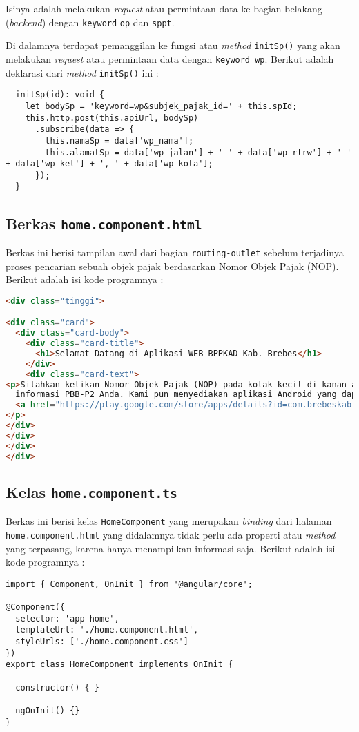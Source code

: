 \documentclass[pdftex,12pt, oneside]{article}
\begin{document}
Isinya adalah melakukan \textit{request} atau permintaan data ke bagian-belakang (\textit{backend}) dengan \texttt{keyword} \texttt{op} dan \texttt{sppt}.

Di dalamnya terdapat pemanggilan ke fungsi atau \textit{method} \texttt{initSp()} yang akan melakukan \textit{request} atau permintaan data dengan \texttt{keyword wp}. Berikut adalah deklarasi dari \textit{method} \texttt{initSp()} ini :

\begin{lstlisting}
  initSp(id): void {
    let bodySp = 'keyword=wp&subjek_pajak_id=' + this.spId;
    this.http.post(this.apiUrl, bodySp)
      .subscribe(data => {
        this.namaSp = data['wp_nama'];
        this.alamatSp = data['wp_jalan'] + ' ' + data['wp_rtrw'] + ' ' + data['wp_kel'] + ', ' + data['wp_kota'];
      });
  }
\end{lstlisting}

\subsection{Berkas \texttt{home.component.html}}

Berkas ini berisi tampilan awal dari bagian \texttt{routing-outlet} sebelum terjadinya proses pencarian sebuah objek pajak berdasarkan Nomor Objek Pajak (NOP). Berikut adalah isi kode programnya :

\begin{lstlisting}[language=html]
<div class="tinggi">

<div class="card">
  <div class="card-body">
    <div class="card-title">
      <h1>Selamat Datang di Aplikasi WEB BPPKAD Kab. Brebes</h1>
    </div>
    <div class="card-text">
<p>Silahkan ketikan Nomor Objek Pajak (NOP) pada kotak kecil di kanan atas untuk mengetahui 
  informasi PBB-P2 Anda. Kami pun menyediakan aplikasi Android yang dapat Anda unduh 
  <a href="https://play.google.com/store/apps/details?id=com.brebeskab.mpbb">disini</a>
</p>
</div>
</div>
</div>
</div>
\end{lstlisting}

\subsection{Kelas \texttt{home.component.ts}}

Berkas ini berisi kelas \texttt{HomeComponent} yang merupakan \textit{binding} dari halaman \texttt{home.component.html} yang didalamnya tidak perlu ada properti atau \textit{method} yang terpasang, karena hanya menampilkan informasi saja. Berikut adalah isi kode programnya :

\begin{lstlisting}
import { Component, OnInit } from '@angular/core';

@Component({
  selector: 'app-home',
  templateUrl: './home.component.html',
  styleUrls: ['./home.component.css']
})
export class HomeComponent implements OnInit {

  constructor() { }

  ngOnInit() {}
}
\end{lstlisting}
\end{document}
